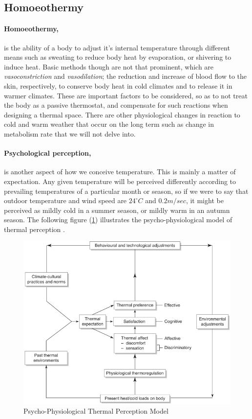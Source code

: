 \subsection{Homoeothermy}
\paragraph{Homoeothermy,}is the ability of a body to adjust it's internal temperature through different means such as sweating to reduce body heat by evaporation, or shivering to induce heat.  Basic methods though are not that prominent, which are \emph{vasoconstriction} and \emph{vasodilation}; the reduction and increase of blood flow to the skin, respectively, to conserve body heat in cold climates and to release it in warmer climates. These are important factors to be considered, so as to not treat the body as a passive thermostat, and compensate for such reactions when designing a thermal space. There are other physiological changes in reaction to cold and warm weather that occur on the long term such as change in metabolism rate that we will not delve into.

\paragraph{Psychological perception,}is another aspect of how we conceive temperature. This is mainly a matter of expectation. Any given temperature will be perceived differently according to prevailing temperatures of a particular month or season, so if we were to say that outdoor temperature and wind speed are $24^\circ C$ and $0.2 m/sec$, it might be perceived as mildly cold in a summer season, or mildly warm in an autumn season. The following figure (\ref{PsychoPhysioModel}) illustrates the psycho-physiological model of thermal perception \cite{szokolay08}.

\begin{figure}[htbp]
\includegraphics[width=13.5cm]{./Images/2-PsychoPhysioModel}
\caption[Psycho-Physiological Thermal Perception Model]{Psycho-Physiological Thermal Perception Model \cite{szokolay08} \label{PsychoPhysioModel}}
\end{figure}

